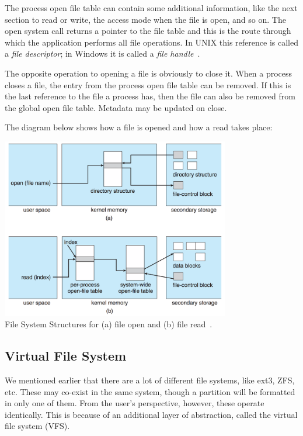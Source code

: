 The process open file table can contain some additional information, like the next section to read or write, the access mode when the file is open, and so on. The open system call returns a pointer to the file table and this is the route through which the application performs all file operations. In UNIX this reference is called a \textit{file descriptor}; in Windows it is called a \textit{file handle}~\cite{osc}.

The opposite operation to opening a file is obviously to close it. When a process closes a file, the entry from the process open file table can be removed. If this is the last reference to the file a process has, then the file can also be removed from the global open file table. Metadata may be updated on close.

The diagram below shows how a file is opened and how a read takes place:

\begin{center}
	\includegraphics[width=0.75\textwidth]{images/file-system-structures.png}\\
	File System Structures for (a) file open and (b) file read~\cite{osc}.
\end{center}

\subsection*{Virtual File System}

We mentioned earlier that there are a lot of different file systems, like ext3, ZFS, etc. These may co-exist in the same system, though a partition will be formatted in only one of them. From the user's perspective, however, these operate identically. This is because of an additional layer of abstraction, called the virtual file system (VFS). 

